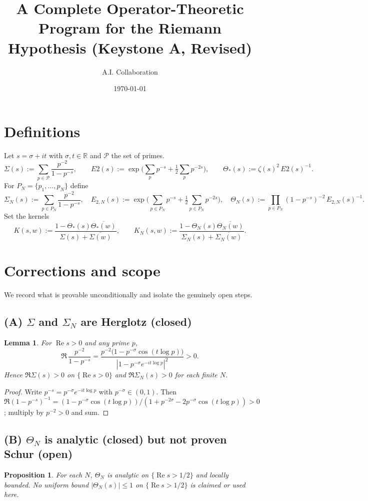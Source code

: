 \documentclass[11pt]{article}
\title{A Complete Operator-Theoretic Program for the Riemann Hypothesis (Keystone A, Revised)}
\author{A.I. Collaboration}
\date{\today}
\newcommand{\Pset}{\mathcal{P}}
\newcommand{\ReS}{\operatorname{Re}}
\newcommand{\Ths}{\Theta_*}
\newcommand{\Si}{\Sigma}
\newcommand{\SiN}{\Sigma_N}
\newcommand{\ThN}{\Theta_N}
\newcommand{\kN}{K_N}
\theoremstyle{plain}
\newtheorem{proposition}[theorem]{Proposition}
\newtheorem{lemma}[theorem]{Lemma}
\theoremstyle{definition}
\theoremstyle{remark}
\begin{document}
\maketitle

\section{Definitions}
Let $s=\sigma+it$ with $\sigma,t\in\mathbb{R}$ and $\Pset$ the set of primes.
\[
\Si(s):=\sum_{p\in\Pset}\frac{p^{-2}}{1-p^{-s}},\qquad
E2(s):=\exp\Big(\sum_{p} p^{-s}+\tfrac12 \sum_{p} p^{-2s}\Big),\qquad
\Ths(s):=\zeta(s)^2\,E2(s)^{-1}.
\]
For $P_N=\{p_1,\dots,p_N\}$ define
\[
\SiN(s):=\sum_{p\in P_N}\frac{p^{-2}}{1-p^{-s}},\quad
E_{2,N}(s):=\exp\Big(\sum_{p\in P_N} p^{-s}+\tfrac12\sum_{p\in P_N} p^{-2s}\Big),\quad
\ThN(s):=\prod_{p\in P_N}(1-p^{-s})^{-2}\,E_{2,N}(s)^{-1}.
\]
Set the kernels
\[
K(s,w):=\frac{1-\Ths(s)\overline{\Ths(w)}}{\Si(s)+\overline{\Si(w)}},\qquad
\kN(s,w):=\frac{1-\ThN(s)\overline{\ThN(w)}}{\SiN(s)+\overline{\SiN(w)}}.
\]

\section{Corrections and scope}
We record what is provable unconditionally and isolate the genuinely open steps.

\subsection*{(A) $\Si$ and $\SiN$ are Herglotz (closed)}
\begin{lemma}\label{lem:herglotz}
For $\ReS s>0$ and any prime $p$,
\[\Re\,\frac{p^{-2}}{1-p^{-s}}=\frac{p^{-2}\big(1-p^{-\sigma}\cos(t\log p)\big)}{\,|1-p^{-\sigma}e^{-it\log p}|^2\,}>0.\]
Hence $\Re \Si(s)>0$ on $\{\ReS s>0\}$ and $\Re \SiN(s)>0$ for each finite $N$.
\end{lemma}
\begin{proof}
Write $p^{-s}=p^{-\sigma}e^{-it\log p}$ with $p^{-\sigma}\in(0,1)$. Then $\Re(1- p^{-s})^{-1}=(1-p^{-\sigma}\cos(t\log p))/(1+p^{-2\sigma}-2p^{-\sigma}\cos(t\log p))>0$; multiply by $p^{-2}>0$ and sum.
\end{proof}

\subsection*{(B) $\ThN$ is analytic (closed) but not proven Schur (open)}
\begin{proposition}\label{prop:thetaN-analytic}
For each $N$, $\ThN$ is analytic on $\{\ReS s>1/2\}$ and locally bounded. No uniform bound $|\ThN(s)|\le 1$ on $\{\ReS s>1/2\}$ is claimed or used here.
\end{proposition}
\end{document}
